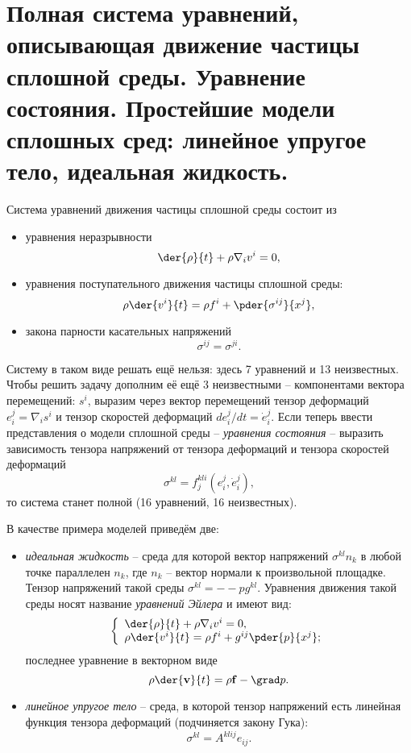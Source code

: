 \chapter{Полная система уравнений, описывающая движение частицы сплошной
среды. Уравнение состояния. Простейшие модели сплошных сред: линейное
упругое тело, идеальная жидкость.}

Система уравнений движения частицы сплошной среды состоит из
\begin{itemize}
\item уравнения неразрывности
\[
    \der{\rho }{t}+ \rho {\nabla_iv^i } = 0,
\]
\item уравнения поступательного движения частицы сплошной среды:
\[
    \rho  \der{v^i}{t}  = \rho f^i + \pder{ \sigma^{ij}}{x^j},
\]
\item закона парности касательных напряжений
\[
    \sigma^{ij} = \sigma^{ji}.
\]
\end{itemize}

Систему в таком виде решать ещё нельзя: здесь 7 уравнений и 13 неизвестных.
Чтобы решить задачу дополним её ещё 3 неизвестными -- компонентами вектора
перемещений: \( s^{i} \), выразим через вектор перемещений тензор деформаций
\( e^j_i  = \nabla_i s^i \) и тензор скоростей деформаций
\( {de^j_i}/{dt} = \dot{e}^j_i \). Если теперь ввести представления о модели
сплошной среды -- \emph{уравнения состояния} -- выразить зависимость тензора
напряжений от тензора деформаций и тензора скоростей деформаций
\[
    \sigma^{kl} = f^{kli}_j(e^j_i, \dot{e}^j_i),
\]
то система станет полной (16 уравнений, 16 неизвестных).

В качестве примера моделей приведём две:
\begin{itemize}
\item \emph{идеальная жидкость} -- среда для которой вектор напряжений
\( \sigma^{kl}n_k \) в любой точке параллелен \( n_k \), где \( n_k \) -- вектор
нормали к произвольной площадке. Тензор напряжений такой среды 
\( \sigma^{kl} = -- p g^{kl} \). Уравнения движения такой среды носят название
\emph{уравнений Эйлера} и имеют вид:
\[
    \left\{\begin{array}{l}
    \der{\rho}{t} + \rho {\nabla_iv^i } = 0, \\
    \rho \der{v^i}{t}  = \rho f^i + g^{ij}\pder{ p}{x^j};
    \end{array}\right.    
\]
последнее уравнение в векторном виде
\[
    \rho\der{\vec{v}}{t} = \rho\vec{f} - \grad p.
\]

\item \emph{линейное упругое тело} -- среда, в которой тензор напряжений есть
линейная функция тензора деформаций (подчиняется закону Гука):
\[
    \sigma^{kl} = A^{klij}e_{ij}.
\]
\end{itemize}

\newpage
